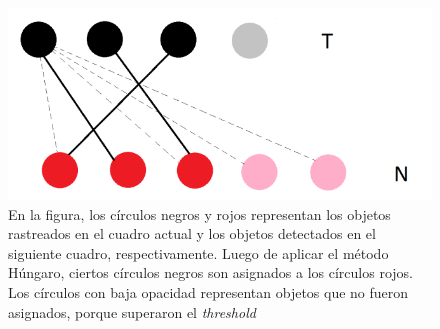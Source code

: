 \documentclass[a4paper,openright,12pt]{report}
\begin{document}
\begin{figure}[H]
  \centering
    \includegraphics[width=1.0\columnwidth]{../images/hungarian-1.png}\par
  \caption{En la figura, los círculos negros y rojos representan los objetos
    rastreados en el cuadro actual y los objetos detectados en el siguiente
    cuadro, respectivamente. Luego de aplicar el método Húngaro, ciertos
    círculos negros son asignados a los círculos rojos. Los círculos con baja
    opacidad representan objetos que no fueron asignados, porque superaron el
    \textit{threshold}}
  \label{fig:hungarian-diagram-1}
\end{figure}
\end{document}
